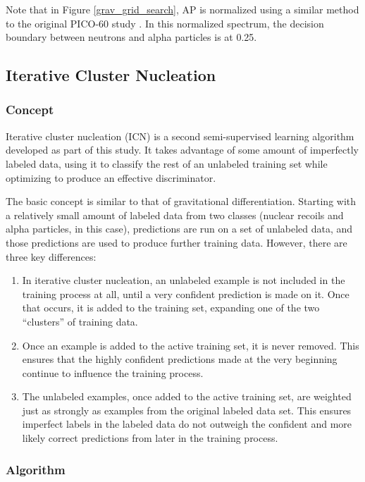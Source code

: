 \documentclass[10pt]{article}
\begin{document}
Note that in Figure \ref{grav_grid_search}, AP is normalized using a similar method to the original PICO-60 study \cite{pico}. In this normalized spectrum, the decision boundary between neutrons and alpha particles is at 0.25.

\subsection{Iterative Cluster Nucleation}

\subsubsection{Concept}

Iterative cluster nucleation (ICN) is a second semi-supervised learning algorithm developed as part of this study. It takes advantage of some amount of imperfectly labeled data, using it to classify the rest of an unlabeled training set while optimizing to produce an effective discriminator.

The basic concept is similar to that of gravitational differentiation. Starting with a relatively small amount of labeled data from two classes (nuclear recoils and alpha particles, in this case), predictions are run on a set of unlabeled data, and those predictions are used to produce further training data. However, there are three key differences:

\begin{enumerate}
    \item In iterative cluster nucleation, an unlabeled example is not included in the training process at all, until a very confident prediction is made on it. Once that occurs, it is added to the training set, expanding one of the two ``clusters'' of training data.
    \item Once an example is added to the active training set, it is never removed. This ensures that the highly confident predictions made at the very beginning continue to influence the training process.
    \item The unlabeled examples, once added to the active training set, are weighted just as strongly as examples from the original labeled data set. This ensures imperfect labels in the labeled data do not outweigh the confident and more likely correct predictions from later in the training process.
\end{enumerate}

\subsubsection{Algorithm}
\end{document}
